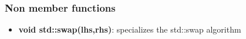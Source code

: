 \documentclass{report}
\begin{document}
        \subsubsection{Non member functions}
        \begin{itemize}
            \item \textbf{void std::swap(lhs,rhs)}: specializes the std::swap algorithm
        \end{itemize}
\end{document}
